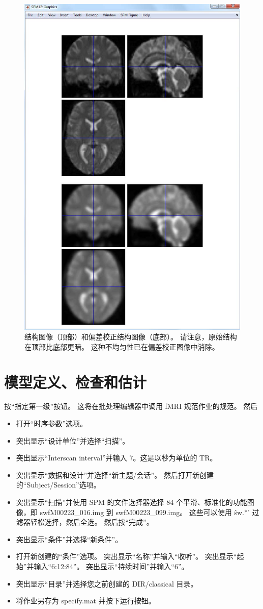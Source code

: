 \begin{figure}[htbp]
	\centering
	\includegraphics[width=0.6\linewidth]{part7/figs/fig_30_7}
	\caption{结构图像（顶部）和偏差校正结构图像（底部）。 请注意，原始结构在顶部比底部更暗。 这种不均匀性已在偏差校正图像中消除。}
	\label{functional_image}
\end{figure}


\section{模型定义、检查和估计}

按“指定第一级”按钮。 这将在批处理编辑器中调用 fMRI 规范作业的规范。 然后
\begin{itemize}
	\item 打开“时序参数”选项。
	\item 突出显示“设计单位”并选择“扫描”。
	\item 突出显示“Interscan interval”并输入 7。这是以秒为单位的 TR。
	\item 突出显示“数据和设计”并选择“新主题/会话”。 然后打开新创建的“Subject/Session”选项。
	\item 突出显示“扫描”并使用 SPM 的文件选择器选择 84 个平滑、标准化的功能图像，即 swfM00223\_016.img 到 swfM00223\_099.img。 这些可以使用 \^sw.*' 过滤器轻松选择，然后全选。 然后按“完成”。
	\item 突出显示“条件”并选择“新条件”。
	\item 打开新创建的“条件”选项。 突出显示“名称”并输入“收听”。 突出显示“起始”并输入“6:12:84”。 突出显示“持续时间”并输入“6”。
	\item 突出显示“目录”并选择您之前创建的 DIR/classical 目录。
	\item 将作业另存为 specify.mat 并按下运行按钮。
\end{itemize}

